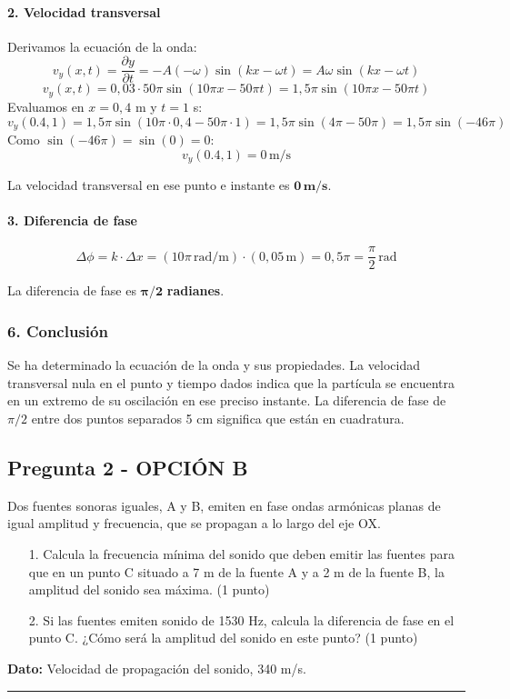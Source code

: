 \paragraph*{2. Velocidad transversal}
Derivamos la ecuación de la onda:
$$v_y(x,t) = \frac{\partial y}{\partial t} = -A(-\omega)\sin(kx - \omega t) = A\omega\sin(kx - \omega t)$$
$$v_y(x,t) = 0,03 \cdot 50\pi \sin(10\pi x - 50\pi t) = 1,5\pi \sin(10\pi x - 50\pi t)$$
Evaluamos en $x=0,4$ m y $t=1$ s:
$$v_y(0.4, 1) = 1,5\pi \sin(10\pi \cdot 0,4 - 50\pi \cdot 1) = 1,5\pi \sin(4\pi - 50\pi) = 1,5\pi \sin(-46\pi)$$
Como $\sin(-46\pi) = \sin(0) = 0$:
$$v_y(0.4, 1) = 0 \, \text{m/s}$$
\begin{cajaresultado}
    La velocidad transversal en ese punto e instante es $\boldsymbol{0 \, \textbf{m/s}}$.
\end{cajaresultado}

\paragraph*{3. Diferencia de fase}
$$\Delta\phi = k \cdot \Delta x = (10\pi \, \text{rad/m}) \cdot (0,05 \, \text{m}) = 0,5\pi = \frac{\pi}{2} \, \text{rad}$$
\begin{cajaresultado}
    La diferencia de fase es $\boldsymbol{\pi/2}$ \textbf{radianes}.
\end{cajaresultado}

\subsubsection*{6. Conclusión}
\begin{cajaconclusion}
Se ha determinado la ecuación de la onda y sus propiedades. La velocidad transversal nula en el punto y tiempo dados indica que la partícula se encuentra en un extremo de su oscilación en ese preciso instante. La diferencia de fase de $\pi/2$ entre dos puntos separados 5 cm significa que están en cuadratura.
\end{cajaconclusion}

\newpage

\subsection{Pregunta 2 - OPCIÓN B}
\label{subsec:2B_2003_sep_ext}

\begin{cajaenunciado}
Dos fuentes sonoras iguales, A y B, emiten en fase ondas armónicas planas de igual amplitud y frecuencia, que se propagan a lo largo del eje OX.
\begin{enumerate}
    \item[1.] Calcula la frecuencia mínima del sonido que deben emitir las fuentes para que en un punto C situado a 7 m de la fuente A y a 2 m de la fuente B, la amplitud del sonido sea máxima. (1 punto)
    \item[2.] Si las fuentes emiten sonido de 1530 Hz, calcula la diferencia de fase en el punto C. ¿Cómo será la amplitud del sonido en este punto? (1 punto)
\end{enumerate}
\textbf{Dato:} Velocidad de propagación del sonido, 340 m/s.
\end{cajaenunciado}
\hrule

